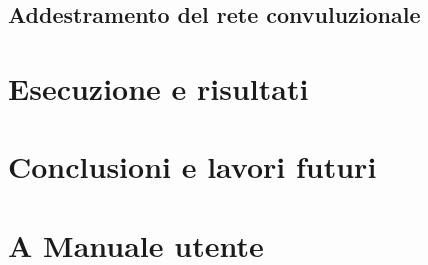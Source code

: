 \documentclass[14pt]{extarticle}
\begin{document}
\subsection{Addestramento del rete convuluzionale}




\section{Esecuzione e risultati}

\section{Conclusioni e lavori futuri}

\section{A Manuale utente}
\printindex
\end{document}
